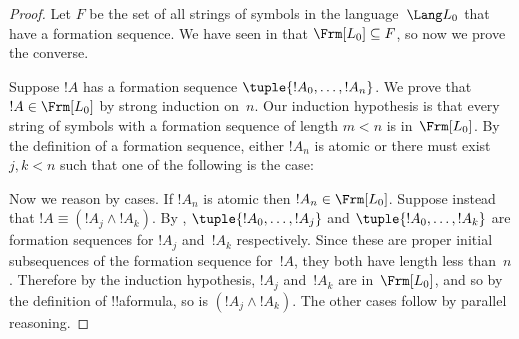 \documentclass[../../../include/open-logic-section]{subfiles}
\begin{document}
\begin{proof}
Let $F$ be the set of all strings of symbols in the
language~$\Lang L_0$ that have a formation sequence.
We have seen in  that
$\Frm[L_0] \subseteq F$, so now we prove the converse.

Suppose $!A$ has a formation sequence $\tuple{!A_0,\dotsc,!A_n}$.
We prove that $!A \in \Frm[L_0]$ by strong induction on~$n$.
Our induction hypothesis is that every string of symbols with a
formation sequence of length $m < n$ is in~$\Frm[L_0]$.
By the definition of a formation sequence, either $!A_n$ is
atomic or there must exist $j,k < n$ such that one of the
following is the case:
\begin{enumerate}
\end{enumerate}
Now we reason by cases. If $!A_n$ is atomic then
$!A_n \in \Frm[L_0]$. Suppose instead that $!A \equiv
(!A_j \land !A_k)$. By ,
$\tuple{!A_0,\dotsc,!A_j}$ and $\tuple{!A_0,\dotsc,!A_k}$ are
formation sequences for $!A_j$ and~$!A_k$ respectively. Since
these are proper initial subsequences of the formation sequence
for~$!A$, they both have length less than~$n$. Therefore by
the induction hypothesis, $!A_j$ and~$!A_k$ are in~$\Frm[L_0]$,
and so by the definition of !!a{formula}, so is
$(!A_j \land !A_k)$. The other cases follow by parallel
reasoning.
\end{proof}
\end{document}
